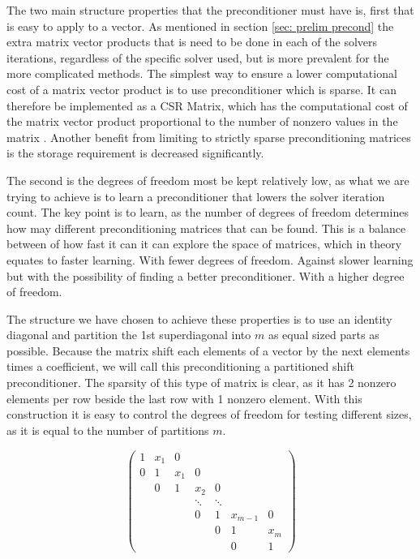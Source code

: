 The two main structure properties that the preconditioner must have is, first that is easy to apply to a vector. As mentioned in section \ref{sec: prelim precond} the extra matrix vector products that is need to be done in each of the solvers iterations, regardless of the specific solver used, but is more prevalent for the more complicated methods. The simplest way to ensure a lower computational cost of a matrix vector product is to use preconditioner which is sparse. It can therefore be implemented as a CSR Matrix, which has the computational cost of the matrix vector product proportional to the number of nonzero values in the matrix \cite{Bai2000}. Another benefit from limiting to strictly sparse preconditioning matrices is the storage requirement is decreased signiﬁcantly.

The second is the degrees of freedom most be kept relatively low, as what we are trying to achieve is to learn a preconditioner that lowers the solver iteration count. The key point is to learn, as the number of degrees of freedom determines how may different preconditioning matrices that can be found. This is a balance between of how fast it can it can explore the space of matrices, which in theory equates to faster learning. With fewer degrees of freedom. Against slower learning but with the possibility of finding a better preconditioner. With a higher degree of freedom.

The structure we have chosen to achieve these properties is to use an identity diagonal and partition the 1st superdiagonal into \(m\) as equal sized parts as possible. Because the matrix shift each elements of a vector by the next elements times a coefficient, we will call this preconditioning a partitioned shift preconditioner. The sparsity of this type of matrix is clear, as it has 2 nonzero elements per row beside the last row with 1 nonzero element. With this construction it is easy to control the degrees of freedom for testing different sizes, as it is equal to the number of partitions \(m\).

\begin{equation}\label{eq: par shift precond}
    \begin{pmatrix}
    1 & x_1 & 0\\
    0 & 1 & x_1 & 0 \\
    &0& 1 & x_2 & 0 \\
    &&&\ddots & \ddots\\
    &&&0&1 & x_{m-1} & 0\\
    &&&&0&1 & x_{m}\\
    &&&&&0&1
    \end{pmatrix}
\end{equation}


